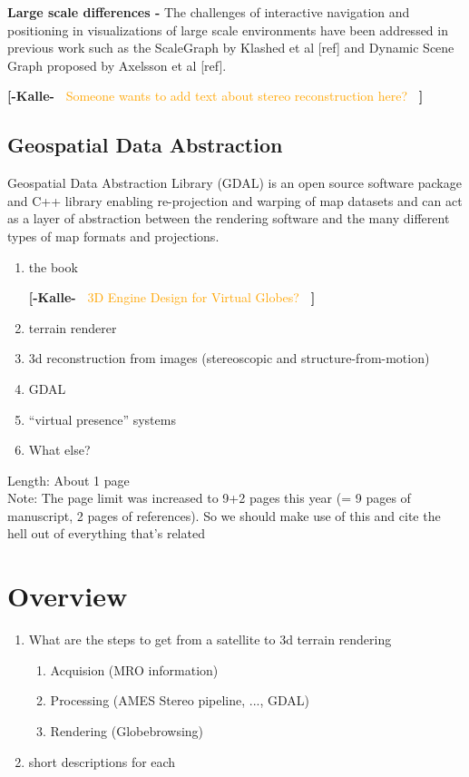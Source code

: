 \documentclass[journal]{vgtc}                %
\newcommand{\kallecomment}[1]{\textbf{[-Kalle-~}
    \textcolor{orange}{#1}
    \textbf{~]}}
\begin{document}
\textbf{Large scale differences - } The challenges of interactive navigation and positioning in visualizations of large scale environments have been addressed in previous work such as the ScaleGraph by Klashed et al [ref] and Dynamic Scene Graph proposed by Axelsson et al [ref].

\kallecomment{Someone wants to add text about stereo reconstruction here?}

\subsection{Geospatial Data Abstraction}

Geospatial Data Abstraction Library (GDAL) is an open source software package and C++ library enabling re-projection and warping of map datasets and can act as a layer of abstraction between the rendering software and the many different types of map formats and projections.

\begin{enumerate}
\item the book

\kallecomment{3D Engine Design for Virtual Globes?}

\item terrain renderer
\item 3d reconstruction from images (stereoscopic and structure-from-motion)
\item GDAL
\item ``virtual presence'' systems
\item What else?
\end{enumerate}
Length: About 1 page\\
Note:  The page limit was increased to 9+2 pages this year (= 9 pages of manuscript, 2 pages of references). So we should make use of this and cite the hell out of everything that's related

\section{Overview} \label{sec:overview}



\begin{enumerate}
  \item What are the steps to get from a satellite to 3d terrain rendering
\begin{enumerate}
  \item Acquision (MRO information)
  \item Processing (AMES Stereo pipeline, ..., GDAL)
  \item Rendering (Globebrowsing)
\end{enumerate}
  \item short descriptions for each
\end{enumerate}
\end{document}

